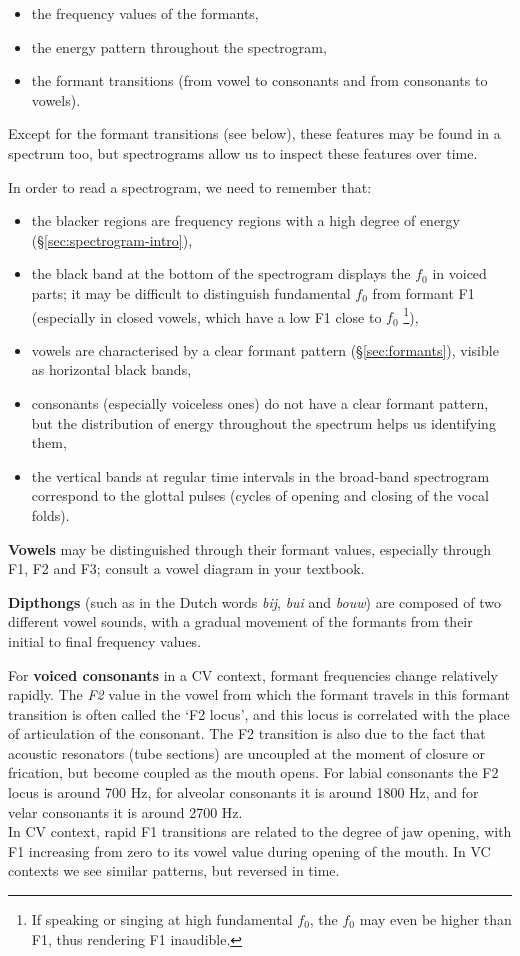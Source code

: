\documentclass[
]{book}
\begin{document}
\begin{itemize}
\item
  the frequency values of the formants,
\item
  the energy pattern throughout the spectrogram,
\item
  the formant transitions (from vowel to consonants and from consonants to vowels).
\end{itemize}

Except for the formant transitions (see below), these features may be found in a spectrum too, but spectrograms allow us to inspect these features over time.

In order to read a spectrogram, we need to remember that:

\begin{itemize}
\item
  the blacker regions are frequency regions with a high degree of energy (§\ref{sec:spectrogram-intro}),
\item
  the black band at the bottom of the spectrogram displays the \(f_0\) in voiced parts; it may be difficult to distinguish fundamental \(f_0\) from formant F1 (especially in closed vowels, which have a low F1 close to \(f_0\) \footnote{If speaking or singing at high fundamental \(f_0\), the \(f_0\) may even be higher than F1, thus rendering F1 inaudible.}),
\item
  vowels are characterised by a clear formant pattern (§\ref{sec:formants}), visible as horizontal black bands,
\item
  consonants (especially voiceless ones) do not have a clear formant pattern, but the distribution of energy throughout the spectrum helps us identifying them,
\item
  the vertical bands at regular time intervals in the broad-band spectrogram correspond to the glottal pulses (cycles of opening and closing of the vocal folds).
\end{itemize}

\textbf{Vowels} may be distinguished through their formant values, especially through F1, F2 and F3; consult a vowel diagram in your textbook.

\textbf{Dipthongs} (such as in the Dutch words \emph{bij}, \emph{bui} and \emph{bouw}) are composed of two different vowel sounds, with a gradual movement of the formants from their initial to final frequency values.

For \textbf{voiced consonants} in a CV context, formant frequencies change relatively rapidly. The \emph{F2} value in the vowel from which the formant travels in this formant transition is often called the `F2 locus', and this locus is correlated with the place of articulation of the consonant. The F2 transition is also due to the fact that acoustic resonators (tube sections) are uncoupled at the moment of closure or frication, but become coupled as the mouth opens.
For labial consonants the F2 locus is around 700 Hz, for alveolar consonants it is around 1800 Hz, and for velar consonants it is around 2700 Hz.\\
In CV context, rapid F1 transitions are related to the degree of jaw opening, with F1 increasing from zero to its vowel value during opening of the mouth.
In VC contexts we see similar patterns, but reversed in time.
\end{document}
